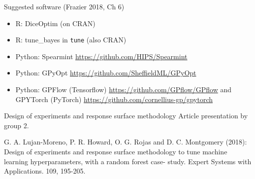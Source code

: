 \documentclass[
  ignorenonframetext,
]{beamer}
\begin{document}
\begin{frame}[fragile]
\begin{block}{Suggested software}
\protect\hypertarget{suggested-software}{}
(Frazier 2018, Ch 6)

\begin{itemize}
\item
  R: DiceOptim (on CRAN)
\item
  R: tune\_bayes in \texttt{tune} (also CRAN)
\item
  Python: Spearmint \url{https://github.com/HIPS/Spearmint}
\item
  Python: GPyOpt \url{https://github.com/SheffieldML/GPyOpt}
\item
  Python: GPFlow (Tensorflow) \url{https://github.com/GPflow/GPflow} and
  GPYTorch (PyTorch) \url{https://github.com/cornellius-gp/gpytorch}
\end{itemize}
\end{block}
\end{frame}

\begin{frame}
\begin{block}{Design of experiments and response surface methodology}
\protect\hypertarget{design-of-experiments-and-response-surface-methodology}{}
Article presentation by group 2.

G. A. Lujan-Moreno, P. R. Howard, O. G. Rojas and D. C. Montgomery
(2018): Design of experiments and response surface methodology to tune
machine learning hyperparameters, with a random forest case- study.
Expert Systems with Applications. 109, 195-205.
\end{block}
\end{frame}
\end{document}
